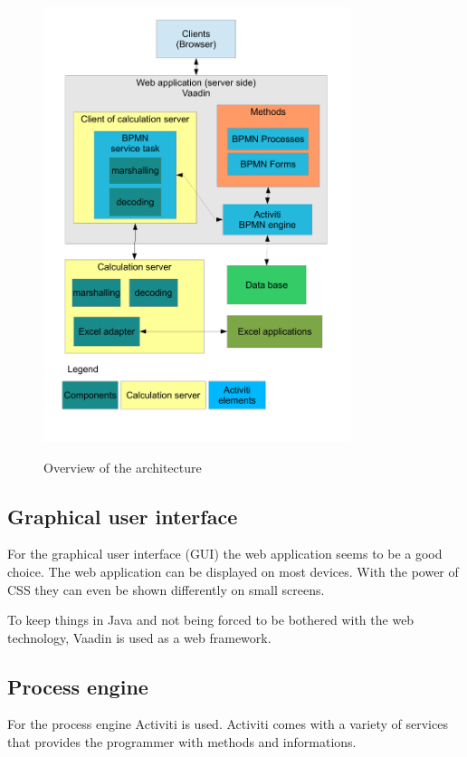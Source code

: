 \documentclass[paper=a4,twoside=false,BCOR=0mm,DIV=calc,fontsize=12pt]{scrartcl}
\begin{document}
\begin{figure}
    \begin{center}
      \includegraphics[width=0.8\textwidth]{./img/ArchitectrueOverview.pdf}\\
    \end{center}
  \caption{Overview of the architecture}
  \label{architectureoverview}
\end{figure} 

\subsection{Graphical user interface}
For the graphical user interface (GUI) the web application seems to be a good choice. The web application can be displayed on most devices. With the power of CSS \cite{css} they can even be shown differently on small screens.

To keep things in Java and not being forced to be bothered with the web technology, Vaadin \cite{Vaadin} is used as a web framework.


\subsection{Process engine}
For the process engine Activiti is used. Activiti comes with a variety of services that provides the programmer with methods and informations.
\end{document}
